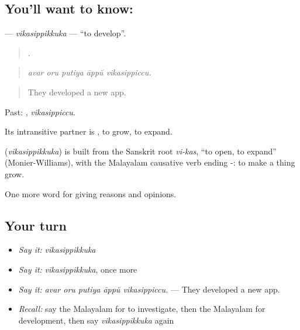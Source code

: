 \subsection*{You'll want to know: }
\textbf{} — \emph{vikasippikkuka} — \textquotedblleft{}to develop\textquotedblright{}.

\begin{quote}
    .
\end{quote}

\begin{quote}
\emph{avar oru putiya āppŭ vikasippiccu.}
\end{quote}

\begin{quote}
They developed a new app.
\end{quote}

Past: , \emph{vikasippiccu}.

Its intransitive partner is , to grow, to expand.

\begin{cousinweb}
\textbf{} (\emph{vikasippikkuka}) is built from the Sanskrit root \emph{vi-kas}, \textquotedblleft{}to open, to expand\textquotedblright{} (Monier-Williams), with the Malayalam causative verb ending -: to make a thing grow.
\end{cousinweb}

\begin{grammarlens}[title={What you've built}]
One more word for giving reasons and opinions.
\end{grammarlens}

\subsection*{Your turn}
\begin{itemize}
\raggedright
  \item \emph{Say it:} \emph{vikasippikkuka}
  \item \emph{Say it:} \emph{vikasippikkuka}, once more
  \item \emph{Say it:} \emph{avar oru putiya āppŭ vikasippiccu.} — They developed a new app.
  \item \emph{Recall:} say the Malayalam for to investigate, then the Malayalam for development, then say \emph{vikasippikkuka} again
\end{itemize}

